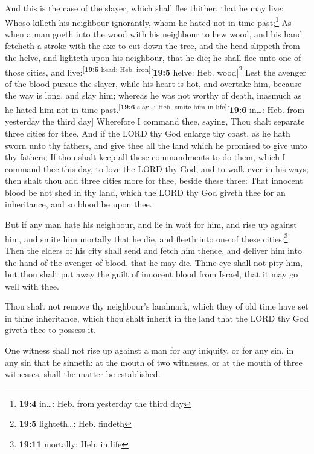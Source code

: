  And this is the case of the slayer, which shall flee
thither, that he may live: Whoso killeth his neighbour ignorantly, whom
he hated not in time past;\footnote{\textbf{19:4} in\ldots: Heb. from
  yesterday the third day}  As when a man goeth into the
wood with his neighbour to hew wood, and his hand fetcheth a stroke with
the axe to cut down the tree, and the head slippeth from the helve, and
lighteth upon his neighbour, that he die; he shall flee unto one of
those cities, and live:\textsuperscript{{[}\textbf{19:5} head: Heb.
iron{]}}{[}\textbf{19:5} helve: Heb. wood{]}\footnote{\textbf{19:5}
  lighteth\ldots: Heb. findeth}  Lest the avenger of the
blood pursue the slayer, while his heart is hot, and overtake him,
because the way is long, and slay him; whereas he was not worthy of
death, inasmuch as he hated him not in time
past.\textsuperscript{{[}\textbf{19:6} slay\ldots: Heb. smite him in
life{]}}{[}\textbf{19:6} in\ldots: Heb. from yesterday the third day{]}
 Wherefore I command thee, saying, Thou shalt separate
three cities for thee.  And if the LORD thy God enlarge
thy coast, as he hath sworn unto thy fathers, and give thee all the land
which he promised to give unto thy fathers;  If thou shalt
keep all these commandments to do them, which I command thee this day,
to love the LORD thy God, and to walk ever in his ways; then shalt thou
add three cities more for thee, beside these three:  That
innocent blood be not shed in thy land, which the LORD thy God giveth
thee for an inheritance, and so blood be upon thee.

 But if any man hate his neighbour, and lie in wait for
him, and rise up against him, and smite him mortally that he die, and
fleeth into one of these cities:\footnote{\textbf{19:11} mortally: Heb.
  in life}  Then the elders of his city shall send and
fetch him thence, and deliver him into the hand of the avenger of blood,
that he may die.  Thine eye shall not pity him, but thou
shalt put away the guilt of innocent blood from Israel, that it may go
well with thee.

 Thou shalt not remove thy neighbour's landmark, which
they of old time have set in thine inheritance, which thou shalt inherit
in the land that the LORD thy God giveth thee to possess it.

 One witness shall not rise up against a man for any
iniquity, or for any sin, in any sin that he sinneth: at the mouth of
two witnesses, or at the mouth of three witnesses, shall the matter be
established.

